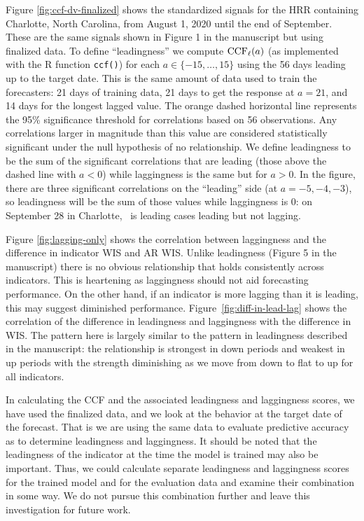 Figure \ref{fig:ccf-dv-finalized} shows the standardized signals for the HRR
containing Charlotte, North Carolina, from August 1, 2020 until the end of
September. These are the same signals shown in Figure 1 in the manuscript but
using finalized data. To define ``leadingness'' we compute $\mathrm{CCF}_{\ell}(a)$ (as
implemented with the R function {\tt ccf()}) for each $a\in \{-15,\ldots,15\}$
using the 56 days leading up to the target date. This is the same amount of data
used to train the forecasters: 21 days of training data, 21 days to get the
response at $a=21$, and 14 days for the longest lagged value. The orange dashed
horizontal line represents the 95\% significance threshold for correlations
based on 56 observations. Any correlations larger in magnitude than this value
are considered statistically significant under the null hypothesis of no
relationship. We define leadingness to be the sum of the significant
correlations that are leading (those above the dashed line with $a<0$) while
laggingness is the same but for $a>0$. In the figure, there are three
significant correlations on the ``leading'' side (at $a = -5, -4, -3$), so
leadingness will be the sum of those values while laggingness is 0: on September
28 in Charlotte, \dv~is leading cases leading but not lagging.

Figure \ref{fig:lagging-only} shows the correlation between laggingness and the
difference in indicator WIS and AR WIS. Unlike leadingness (Figure 5 in the
manuscript) there is no obvious relationship that holds consistently across
indicators. This is heartening as laggingness should not aid forecasting
performance. On the other hand, if an indicator is more lagging than it is
leading, this may suggest diminished performance.
Figure~\ref{fig:diff-in-lead-lag} shows the correlation of the difference in
leadingness and laggingness with the difference in WIS. The pattern here is
largely similar to the pattern in leadingness described in the manuscript: the
relationship is strongest in down periods and weakest in up periods with the
strength diminishing as we move from down to flat to up for all indicators.

In calculating the CCF and the associated leadingness and laggingness scores, we
have used the finalized data, and we look at the behavior at the target date of
the forecast. That is we are using the same data to evaluate predictive accuracy
as to determine leadingness and laggingness. It should be noted that the
leadingness of the indicator at the time the model is trained may also be
important. Thus, we could calculate separate leadingness and laggingness scores
for the trained model and for the evaluation data and examine their combination
in some way. We do not pursue this combination further and leave this
investigation for future work.

